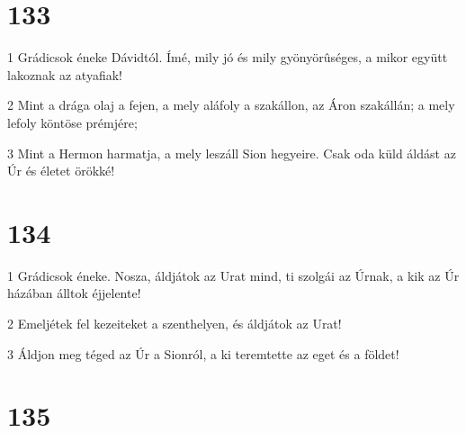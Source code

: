 \chapter{133}

\par 1 Grádicsok éneke Dávidtól. Ímé, mily jó és mily gyönyörûséges, a mikor együtt lakoznak az atyafiak!
\par 2 Mint a drága olaj a fejen, a mely aláfoly a szakállon, az Áron szakállán; a mely lefoly köntöse prémjére;
\par 3 Mint a Hermon harmatja, a mely leszáll Sion hegyeire. Csak oda küld áldást az Úr és életet örökké!

\chapter{134}

\par 1 Grádicsok éneke. Nosza, áldjátok az Urat mind, ti szolgái az Úrnak, a kik az Úr házában álltok éjjelente!
\par 2 Emeljétek fel kezeiteket a szenthelyen, és áldjátok az Urat!
\par 3 Áldjon meg téged az Úr a Sionról, a ki teremtette az eget és a földet!

\chapter{135}

